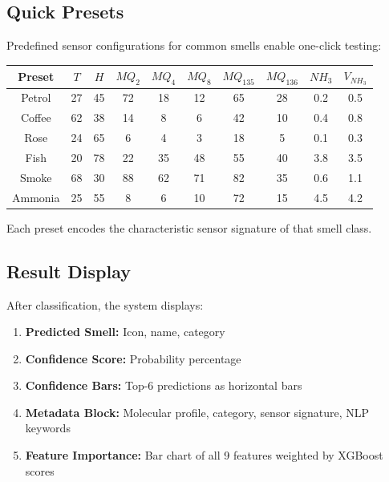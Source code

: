 \documentclass[10pt]{article}
\begin{document}
\subsection{Quick Presets}

Predefined sensor configurations for common smells enable one-click testing:

\begin{table}[ht]
\centering
\small
\begin{tabular}{|c|ccccccccc|}
\hline
\textbf{Preset} & $T$ & $H$ & $MQ_2$ & $MQ_4$ & $MQ_8$ & $MQ_{135}$ & $MQ_{136}$ & $NH_3$ & $V_{NH_3}$ \\
\hline
Petrol & 27 & 45 & 72 & 18 & 12 & 65 & 28 & 0.2 & 0.5 \\
Coffee & 62 & 38 & 14 & 8 & 6 & 42 & 10 & 0.4 & 0.8 \\
Rose & 24 & 65 & 6 & 4 & 3 & 18 & 5 & 0.1 & 0.3 \\
Fish & 20 & 78 & 22 & 35 & 48 & 55 & 40 & 3.8 & 3.5 \\
Smoke & 68 & 30 & 88 & 62 & 71 & 82 & 35 & 0.6 & 1.1 \\
Ammonia & 25 & 55 & 8 & 6 & 10 & 72 & 15 & 4.5 & 4.2 \\
\hline
\end{tabular}
\end{table}

Each preset encodes the characteristic sensor signature of that smell class.

\subsection{Result Display}

After classification, the system displays:

\begin{enumerate}
    \item \textbf{Predicted Smell:} Icon, name, category
    \item \textbf{Confidence Score:} Probability percentage
    \item \textbf{Confidence Bars:} Top-6 predictions as horizontal bars
    \item \textbf{Metadata Block:} Molecular profile, category, sensor signature, NLP keywords
    \item \textbf{Feature Importance:} Bar chart of all 9 features weighted by XGBoost scores
\end{enumerate}


\end{document}
